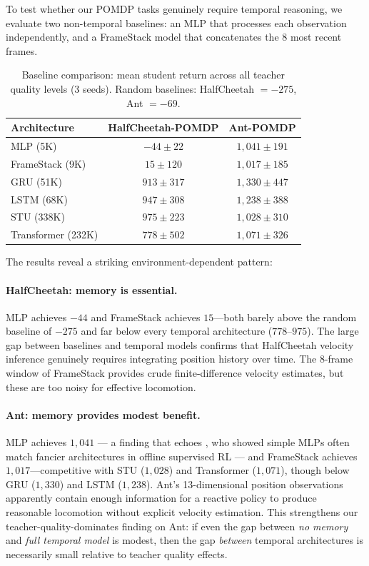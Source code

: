 To test whether our POMDP tasks genuinely require temporal reasoning, we evaluate two non-temporal baselines: an MLP that processes each observation independently, and a FrameStack model that concatenates the 8 most recent frames.

\begin{table}[ht]
\centering
\caption{Baseline comparison: mean student return across all teacher quality levels (3 seeds). Random baselines: HalfCheetah $= -275$, Ant $= -69$.}
\label{tab:baselines}
\begin{tabular}{lcc}
\toprule
Architecture & HalfCheetah-POMDP & Ant-POMDP \\
\midrule
MLP (5K)         & $-44 \pm 22$    & $1{,}041 \pm 191$ \\
FrameStack (9K)  & $15 \pm 120$    & $1{,}017 \pm 185$ \\
\midrule
GRU (51K)        & $913 \pm 317$   & $1{,}330 \pm 447$ \\
LSTM (68K)       & $947 \pm 308$   & $1{,}238 \pm 388$ \\
STU (338K)       & $975 \pm 223$   & $1{,}028 \pm 310$ \\
Transformer (232K) & $778 \pm 502$ & $1{,}071 \pm 326$ \\
\bottomrule
\end{tabular}
\end{table}

The results reveal a striking environment-dependent pattern:

\paragraph{HalfCheetah: memory is essential.}
MLP achieves $-44$ and FrameStack achieves $15$---both barely above the random baseline of $-275$ and far below every temporal architecture ($778$--$975$).
The large gap between baselines and temporal models confirms that HalfCheetah velocity inference genuinely requires integrating position history over time.
The 8-frame window of FrameStack provides crude finite-difference velocity estimates, but these are too noisy for effective locomotion.

\paragraph{Ant: memory provides modest benefit.}
MLP achieves $1{,}041$ --- a finding that echoes \citet{emmons2022rvs}, who showed simple MLPs often match fancier architectures in offline supervised RL --- and FrameStack achieves $1{,}017$---competitive with STU ($1{,}028$) and Transformer ($1{,}071$), though below GRU ($1{,}330$) and LSTM ($1{,}238$).
Ant's 13-dimensional position observations apparently contain enough information for a reactive policy to produce reasonable locomotion without explicit velocity estimation.
This strengthens our teacher-quality-dominates finding on Ant: if even the gap between \emph{no memory} and \emph{full temporal model} is modest, then the gap \emph{between} temporal architectures is necessarily small relative to teacher quality effects.

